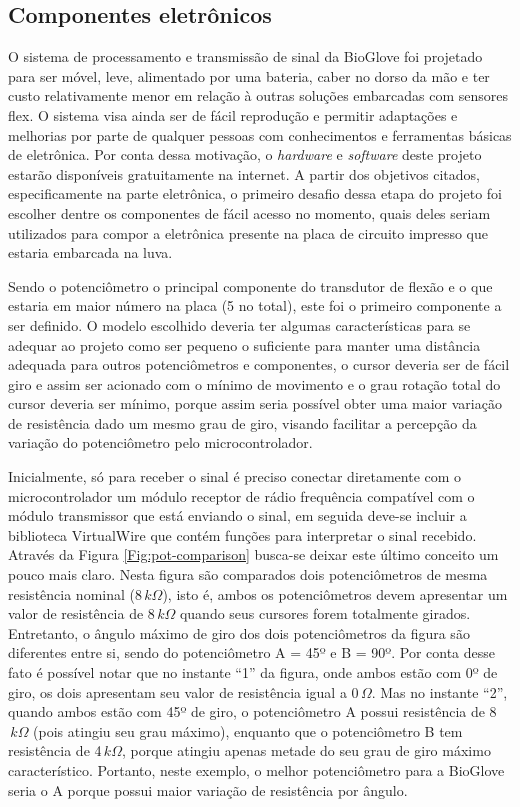 \documentclass[
	12pt,				%
	openright,			%
	oneside,			%
	a4paper,			%
	english,			%
	brazil				%
	]{abntex2}
\begin{document}
			
			\subsection{Componentes eletrônicos}	

			O sistema de processamento e transmissão de sinal da BioGlove foi projetado para ser móvel, leve, alimentado por uma bateria, caber no dorso da mão e ter custo relativamente menor em relação à outras soluções embarcadas com sensores flex. O sistema visa ainda ser de fácil reprodução e permitir adaptações e melhorias por parte de qualquer pessoas com conhecimentos e ferramentas básicas de eletrônica. Por conta dessa motivação, o \textit{hardware} e \textit{software} deste projeto estarão disponíveis gratuitamente na internet. A partir dos objetivos citados, especificamente na parte eletrônica, o primeiro desafio dessa etapa do projeto foi escolher dentre os componentes de fácil acesso no momento, quais deles seriam utilizados para compor a eletrônica presente na placa de circuito impresso que estaria embarcada na luva.
			
			Sendo o potenciômetro o principal componente do transdutor de flexão e o que estaria em maior número na placa (5 no total), este foi o primeiro componente a ser definido. O modelo escolhido deveria ter algumas características para se adequar ao projeto como ser pequeno o suficiente para manter uma distância adequada para outros potenciômetros e componentes, o cursor deveria ser de fácil giro e assim ser acionado com o mínimo de movimento e o grau rotação total do cursor deveria ser mínimo, porque assim seria possível obter uma maior variação de resistência dado um mesmo grau de giro, visando facilitar a percepção da variação do potenciômetro pelo microcontrolador. 
			
		Inicialmente, só para receber o sinal é preciso conectar diretamente com o microcontrolador um módulo receptor de rádio frequência compatível com o módulo transmissor que está enviando o sinal, em seguida deve-se incluir a biblioteca VirtualWire que contém funções para interpretar o sinal recebido. 
			Através da Figura \ref{Fig:pot-comparison} busca-se deixar este último conceito um pouco mais claro. Nesta figura são comparados dois potenciômetros de mesma resistência nominal (8$\,k\Omega$), isto é, ambos os potenciômetros devem apresentar um valor de resistência de 8$\,k\Omega$ quando seus cursores forem totalmente girados. Entretanto, o ângulo máximo de giro dos dois potenciômetros da figura são diferentes entre si, sendo do potenciômetro A = 45º e B = 90º. Por conta desse fato é possível notar que no instante ``1'' da figura, onde ambos estão com 0º de giro, os dois apresentam seu valor de resistência igual a 0$\,\Omega$. Mas no instante ``2'', quando ambos estão com 45º de giro, o potenciômetro A possui resistência de 8$\,k\Omega$ (pois atingiu seu grau máximo), enquanto que o potenciômetro B tem resistência de 4$\,k\Omega$, porque atingiu apenas metade do seu grau de giro máximo característico. Portanto, neste exemplo, o melhor potenciômetro para a BioGlove seria o A porque possui maior variação de resistência por ângulo.
\end{document}
